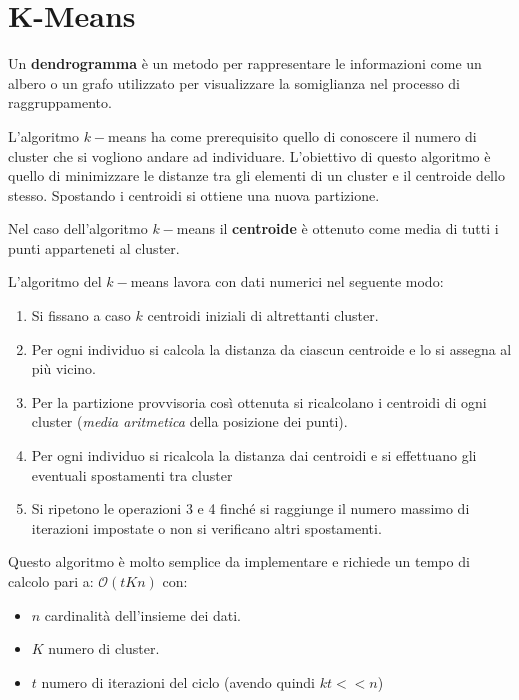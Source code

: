 \section{K-Means}
\begin{definizione}
    Un \textbf{dendrogramma} è un metodo per rappresentare le informazioni come
    un albero o un grafo utilizzato per visualizzare la somiglianza nel processo
    di raggruppamento.
\end{definizione}
L'algoritmo $k-$means ha come prerequisito quello di conoscere il numero di cluster
che si vogliono andare ad individuare. L'obiettivo di questo algoritmo è quello
di minimizzare le distanze tra gli elementi di un cluster e il centroide dello stesso.
Spostando i centroidi si ottiene una nuova partizione.
\begin{definizione}
    Nel caso dell'algoritmo $k-$means il \textbf{centroide} è ottenuto come media
    di tutti i punti apparteneti al cluster.
\end{definizione}
L'algoritmo del $k-$means lavora con dati numerici nel seguente modo:
\begin{enumerate}
    \item Si fissano a caso $k$ centroidi iniziali di altrettanti cluster.
    \item Per ogni individuo si calcola la distanza da ciascun centroide e lo si
          assegna al più vicino.
    \item Per la partizione provvisoria così ottenuta si ricalcolano i centroidi
          di ogni cluster (\textit{media aritmetica} della posizione dei punti).
    \item Per ogni individuo si ricalcola la distanza dai centroidi e si effettuano
          gli eventuali spostamenti tra cluster
    \item Si ripetono le operazioni 3 e 4 finché si raggiunge il numero massimo
          di iterazioni impostate o non si verificano altri spostamenti.
\end{enumerate}
Questo algoritmo è molto semplice da implementare e richiede un tempo di calcolo
pari a: $\mathcal{O}(tKn)$ con:
\begin{itemize}
    \item $n$ cardinalità dell'insieme dei dati.
    \item $K$ numero di cluster.
    \item $t$ numero di iterazioni del ciclo (avendo quindi $kt << n$)
\end{itemize}

